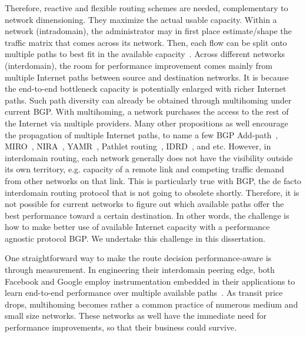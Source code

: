 Therefore, reactive and flexible routing schemes are needed, complementary to network dimensioning.
They maximize the actual usable capacity.
Within a network (intradomain), the administrator may in first place estimate/shape the traffic matrix 
that comes across its network. Then, each flow can be split onto multiple paths to best fit in the available capacity~\cite{Xu2011, Jain2013}.
Across different networks (interdomain), the room for performance improvement comes mainly from multiple Internet paths between source and destination networks.
It is because the end-to-end bottleneck capacity is potentially enlarged with richer Internet paths.
Such path diversity can already be obtained through multihoming under current \acf{BGP}. With multihoming, a network purchases the access to the rest of the Internet via multiple providers. Many other propositions as well encourage the propagation of multiple Internet paths, to name a few BGP Add-path~\cite{addpath}, MIRO~\cite{Xu2006}, NIRA~\cite{Yang2007}, YAMR~\cite{Ganichev2010}, Pathlet routing~\cite{Godfrey09}, IDRD~\cite{Misseri2013}, and etc.
However, in interdomain routing, each network generally does not have the visibility outside its own territory, e.g. capacity of a remote link and competing traffic demand from other networks on that link.
This is particularly true with \ac{BGP}, the de facto interdomain routing protocol that is not going to obsolete shortly.
Therefore, it is not possible for current networks to figure out which available paths offer the best performance toward a certain destination.
In other words, the challenge is how to make better use of available Internet capacity with a performance agnostic protocol \ac{BGP}.
We undertake this challenge in this dissertation.

One straightforward way to make the route decision performance-aware is through measurement. In engineering their interdomain peering edge, both Facebook and Google employ instrumentation embedded in their applications to learn end-to-end performance over multiple available paths~\cite{Yap2017, Schlinker2017}.
As transit price drops, multihoming becomes rather a common practice of numerous medium and small size networks. 
These networks as well have the immediate need for performance improvements, so that their business could survive.

